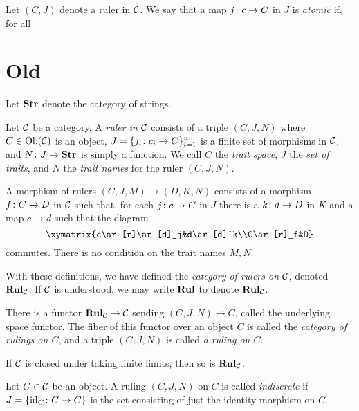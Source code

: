 \documentclass{amsart}
\def\Rul{{\bf Rul}}
\def\Str{{\bf Str}}
\begin{document}
\begin{definition}

Let $(C,J)$ denote a ruler in $\mathcal{C}$.  We say that a map $j\colon c\rightarrow C$ in $J$ is {\em atomic} if, for all 

\end{definition}

\section{Old}

Let $\Str$ denote the category of strings.

\begin{definition}

Let $\mathcal{C}$ be a category.  A {\em ruler in $\mathcal{C}$} consists of a triple $(C,J,N)$ where $C\in\textnormal{Ob}(\mathcal{C})$ is an object, $J=\{j_i\colon c_i\rightarrow C\}_{i=1}^n$ is a finite set of morphisms in $\mathcal{C}$, and $N\taking J\to\Str$ is simply a function.  We call $C$ the {\em trait space}, $J$ the {\em set of traits}, and $N$ the {\em trait names} for the ruler $(C,J,N)$.

A morphism of rulers $(C,J,M)\to (D,K,N)$ consists of a morphism $f\colon C\rightarrow D$ in $\mathcal{C}$ such that, for each $j\colon c\rightarrow C$ in $J$ there is a $k\colon d\rightarrow D$ in $K$ and a map $c\to d$ such that the diagram $$\xymatrix{c\ar[r]\ar[d]_j&d\ar[d]^k\\C\ar[r]_f&D}$$ commutes.  There is no condition on the trait names $M,N$.

With these definitions, we have defined the {\em category of rulers on $\mathcal{C}$}, denoted $\Rul_\mcC$.  If $\mathcal{C}$ is understood, we may write $\Rul$ to denote $\Rul_\mcC$.

There is a functor $\Rul_\mcC\to\mcC$ sending $(C,J,N)\to C$, called the underlying space functor.  The fiber of this functor over an object $C$ is called the {\em category of rulings on $C$}, and a triple $(C,J,N)$ is called {\em a ruling on $C$}.

\end{definition}

\begin{lemma}

If $\mathcal{C}$ is closed under taking finite limits, then so is $\Rul_\mcC$.

\end{lemma}

\begin{definition}

Let $C\in\mathcal{C}$ be an object.  A ruling $(C,J,N)$ on $C$ is called {\em indiscrete} if $J=\{\textnormal{id}_C\colon C\rightarrow C\}$ is the set consisting of just the identity morphism on $C$.  

\end{definition}
\end{document}

